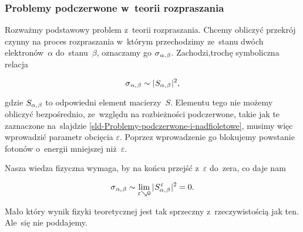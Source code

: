 \documentclass[10pt,t]{beamer}
\begin{document}
\begin{frame}
  \frametitle{Problemy podczerwone w~teorii rozpraszania}


  Rozważmy podstawowy problem z~teorii rozpraszania. Chcemy obliczyć
  przekrój czynny na proces rozpraszania w~którym przechodzimy ze~stanu
  dwóch elektronów~$\alpha$ do~stanu~$\beta$, oznaczamy go
  $\sigma_{ \hspace{0.05em} \alpha, \hspace{0.05em} \beta }$. Zachodzi,trochę symboliczna relacja

  \vspace{-2.1em}


  \begin{equation}
    \label{eq:Glowne-rodzaje-problemow-podczerwonych-14}
    \sigma_{ \hspace{0.05em} \alpha, \hspace{0.07em} \beta } \sim
    | \hspace{0.05em}  S_{ \alpha, \hspace{0.05em} \beta }  \hspace{0.05em} |^{ 2 },
  \end{equation}

  \vspace{-1.8em}


  gdzie $S_{ \alpha, \hspace{0.05em} \beta }$ to odpowiedni element macierzy~$S$. Elementu
  tego nie możemy obliczyć bezpośrednio, ze~względu na rozbieżności
  podczerwone, takie jak te zaznaczone na~slajdzie
  \eqref{sld-Problemy-podczerwone-i-nadfioletowe}, musimy więc wprowadzić
  parametr obcięcia $\varepsilon$. Poprzez wprowadzenie go blokujemy powstanie
  fotonów o~energii mniejszej niż~$\varepsilon$.

  Nasza wiedza fizyczna wymaga, by na końcu przejść z~$\varepsilon$ do~zera,
  co daje nam

  \vspace{-2.3em}


  \begin{equation}
    \label{eq:Glowne-rodzaje-problemow-podczerwonych-15}
    \sigma_{ \hspace{0.05em} \alpha, \hspace{0.07em} \beta } \sim
    \lim_{ \varepsilon \searrow 0 }
    | \hspace{0.05em}  S_{ \alpha, \hspace{0.05em} \beta }^{ \hspace{0.05em} \varepsilon }  \hspace{0.05em} |^{ 2 } = 0.
  \end{equation}

  \vspace{-1.7em}


  Mało który wynik fizyki teoretycznej jest tak sprzeczny z~rzeczywistością
  jak ten. Ale~się nie poddajemy.

\end{frame}
\end{document}
